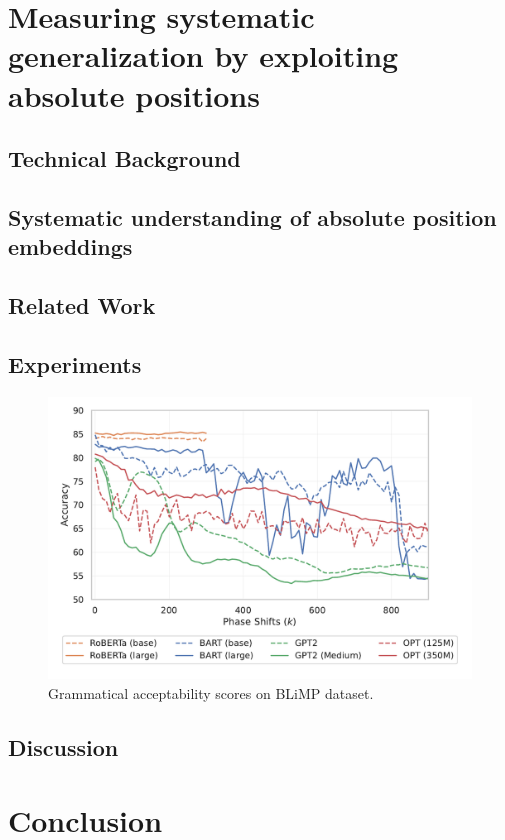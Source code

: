 \documentclass[letterpaper, 12pt]{report}
\begin{document}
\chapter{Measuring systematic generalization by exploiting absolute positions}
\label{sec:org4fe017f}

\section{Technical Background}
\label{sec:orge980475}
\section{Systematic understanding of absolute position embeddings}
\label{sec:orgc239d2d}
\section{Related Work}
\label{sec:org6149bb0}
\section{Experiments}
\label{sec:orgad6ec35}

\begin{figure}[htbp]
\centering
\includegraphics[width=.9\linewidth]{figs/pos_enc/acceptability_scores.pdf}
\caption{Grammatical acceptability scores on BLiMP dataset.}
\end{figure}

\section{Discussion}
\label{sec:org8d72560}
\clearpage
\chapter{Conclusion}
\label{sec:org0188af2}
\end{document}
